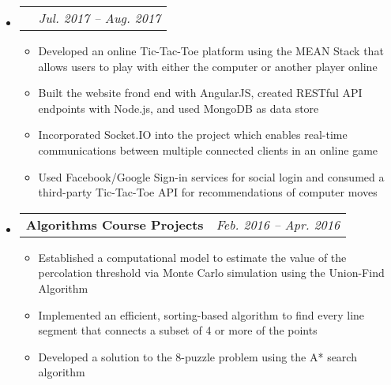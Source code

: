 \documentclass{article}
\makeatletter
\newcommand{\resitem}[1]{
    \item #1
    \vspace{-2pt}
}
\newcommand{\ressubheadingproj}[2]{
\begin{tabular*}{6.80in}{l@{\extracolsep{\fill}}r}
    \textbf{#1} & \textit{#2} \\
\end{tabular*}\vspace{-6pt}}
\makeatother
\begin{document}
    \begin{itemize}
        \item\ressubheadingproj
        {\href
            {https://github.com/jeremylinlin/tic-tac-toe-mean}
            {Multiplayer Tic-Tac-Toe Game Platform}
        }
        {Jul. 2017 -- Aug. 2017}
        {\footnotesize
        \begin{itemize}
            \resitem
            {Developed an online Tic-Tac-Toe platform using the MEAN Stack that allows
            users to play with either the computer or another player online}
            \resitem
            {Built the website frond end with AngularJS, created RESTful
            API endpoints with Node.js, and used MongoDB as data store}
            \resitem
            {Incorporated Socket.IO into the project which enables real-time
            communications between multiple connected clients in an online game}
            \resitem
            {Used Facebook/Google Sign-in services for social login and consumed a
            third-party Tic-Tac-Toe API for recommendations of computer moves}
        \end{itemize}
        }
    \end{itemize}

    \begin{itemize}
        \item\ressubheadingproj
        {Algorithms Course Projects}{Feb. 2016 -- Apr. 2016}
        {\footnotesize
        \begin{itemize}
            \resitem
            {Established a computational model to estimate the value of the percolation
            threshold via Monte Carlo simulation using the Union-Find Algorithm}
            \resitem
            {Implemented an efficient, sorting-based algorithm to find every line segment
            that connects a subset of 4 or more of the points}
            \resitem
            {Developed a solution to the 8-puzzle problem using the A* search algorithm}
        \end{itemize}
        }
    \end{itemize}

\end{document}
